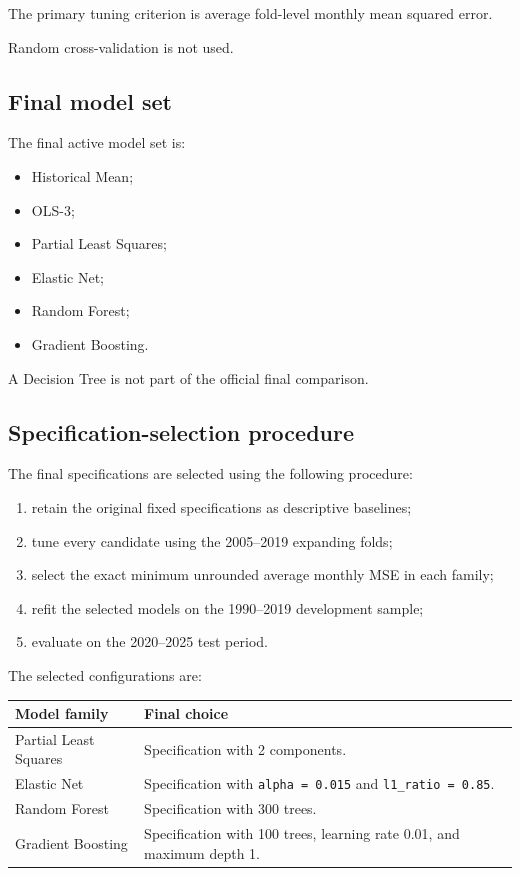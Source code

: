 \documentclass[11pt,a4paper]{article}
\newcommand{\code}[1]{\texttt{#1}}
\begin{document}
The primary tuning criterion is average fold-level monthly mean squared error.

Random cross-validation is not used.

\subsection{Final model set}

The final active model set is:

\begin{itemize}
  \item Historical Mean;
  \item OLS-3;
  \item Partial Least Squares;
  \item Elastic Net;
  \item Random Forest;
  \item Gradient Boosting.
\end{itemize}

A Decision Tree is not part of the official final comparison.

\subsection{Specification-selection procedure}

The final specifications are selected using the following procedure:

\begin{enumerate}
  \item retain the original fixed specifications as descriptive baselines;
  \item tune every candidate using the 2005--2019 expanding folds;
  \item select the exact minimum unrounded average monthly MSE in each family;
  \item refit the selected models on the 1990--2019 development sample;
  \item evaluate on the 2020--2025 test period.
\end{enumerate}

The selected configurations are:

\begin{center}
\small
\begin{tabularx}{0.94\textwidth}{p{3.2cm}Y}
\toprule
Model family & Final choice \\
\midrule

Partial Least Squares
&
Specification with 2 components.
\\

Elastic Net
&
Specification with
\code{alpha = 0.015} and
\code{l1\_ratio = 0.85}.
\\

Random Forest
&
Specification with 300 trees.
\\

Gradient Boosting
&
Specification with 100 trees, learning rate 0.01, and maximum depth 1.
\\

\bottomrule
\end{tabularx}
\end{center}
\end{document}
